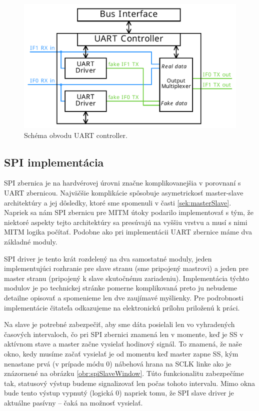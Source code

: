 \begin{figure}
    \centerline{\includegraphics[width=1\textwidth]{images/designs/uartController.pdf}}
    \caption[Schéma obvodu UART controller]{Schéma obvodu UART controller.}
    \label{obr:uartController}
\end{figure}

\subsection{SPI implementácia}
SPI zbernica je na hardvérovej úrovni značne komplikovanejšia v porovnaní s UART zbernicou. Najväčšie komplikácie spôsobuje asymetrickosť master-slave architektúry a jej dôsledky, ktoré sme spomenuli v časti \ref{sek:masterSlave}. Napriek sa nám SPI zbernicu pre MITM útoky podarilo implementovať s tým, že niektoré aspekty tejto architektúry sa presúvajú na vyššiu vrstvu a musí s nimi MITM logika počítať. Podobne ako pri implementácii UART zbernice máme dva základné moduly.

SPI driver je tento krát rozdelený na dva samostatné moduly, jeden implementujúci rozhranie pre slave stranu (sme pripojený mastrovi) a jeden pre master stranu (pripojený k slave skutočnému zariadeniu). Implementácia týchto modulov je po technickej stránke pomerne komplikovaná preto ju nebudeme detailne opisovať a spomenieme len dve zaujímavé myšlienky. Pre podrobnosti implementácie čitateľa odkazujeme na elektronickú prílohu priloženú k práci.

Na slave je potrebné zabezpečiť, aby sme dáta posielali len vo vyhradených časových intervaloch, čo pri SPI zbernici znamená len v momente, keď je SS v aktívnom stave a master začne vysielať hodinový signál. To znamená, že naše okno, kedy musíme začať vysielať je od momentu keď master zapne SS, kým nenastane prvá (v prípade módu 0) nábehová hrana na SCLK linke ako je znázornené na obrázku \ref{obr:spiSlaveWindow}. Túto funkcionalitu zabezpečíme tak, statusový výstup  budeme signalizovať len počas tohoto intervalu. Mimo okna bude tento výstup vypnutý (logická 0) napriek tomu, že SPI slave driver je aktuálne pasívny -- čaká na možnosť vysielať.

